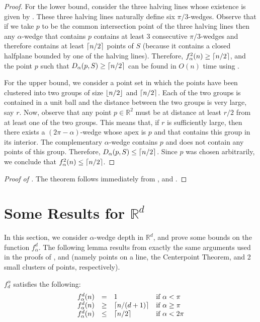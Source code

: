 \documentclass[lotsofwhite]{patmorin}
\newcommand{\R}{\mathbb{R}}
\begin{document}
\begin{proof}
For the lower bound, consider the three halving lines whose existence
is given by .  These three halving lines
naturally define six $\pi/3$-wedges.  Observe that if we take $p$ to
be the common intersection point of the three halving lines then any
$\alpha$-wedge that contains $p$ contains at least 3 consecutive
$\pi/3$-wedges and therefore contains at least $\left\lceil n/2 \right\rceil$ points of $S$
(because it contains a closed halfplane bounded by one of the
halving lines).  Therefore, $f^2_\alpha(n)\ge \left\lceil n/2 \right\rceil$, and the
point $p$ such that $D_\alpha(p,S)\ge \left\lceil n/2 \right\rceil$ can be found in $O(n)$
time using .

 
For the upper bound, we consider a point set in which the points have
been clustered into two groups of size $\left\lfloor n/2 \right\rfloor$ and $\left\lceil n/2 \right\rceil$.
Each of the two groups is contained in a unit ball and the distance
between the two groups is very large, say $r$.  Now, observe that any
point $p\in\R^2$ must be at distance at least $r/2$ from at
least one of the two groups.  This means that, if $r$ is sufficiently
large, then there exists a $(2\pi-\alpha)$-wedge whose apex is $p$ and
that contains this group in its interior.  The complementary
$\alpha$-wedge contains $p$ and does not contain any points of this
group.  Therefore, $D_\alpha(p,S)\le \left\lceil n/2 \right\rceil$.  Since $p$ was
chosen arbitrarily, we conclude that $f^2_\alpha(n)\le \left\lceil n/2 \right\rceil$.
\end{proof}

\begin{proof}[Proof of ] 
The theorem follows immediately from , 
and .
\end{proof}

\section{Some Results for $\R^d$}

In this section, we consider $\alpha$-wedge depth in $\R^d$,
and prove  some bounds on the function $f^d_\alpha$.  The following
lemma results from exactly the same arguments used in the proofs of
,  and  (namely points on a line, the
Centerpoint Theorem, and 2 small clusters of points, respectively).

\begin{lem}
$f^\alpha_d$ satisfies the following:
\[\begin{array}{lcll}
  f^d_\alpha(n) & = & 1 & \mbox{if $\alpha < \pi$} \\
  f^d_\alpha(n) & \ge & \left\lceil n/(d+1) \right\rceil & \mbox{if $\alpha \ge \pi$} \\
  f^d_\alpha(n) & \le & \left\lceil n/2 \right\rceil & \mbox{if $\alpha < 2\pi$} \\
\end{array}\]
\end{lem}
\end{document}
